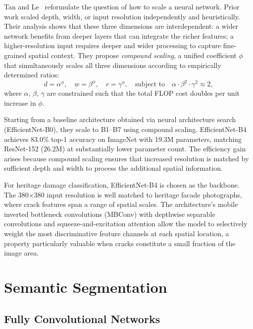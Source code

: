 \documentclass[12pt,a4paper]{article}
\begin{document}
Tan and Le~\cite{tan2019efficientnet} reformulate the question of how to scale a neural network. Prior work scaled depth, width, or input resolution independently and heuristically. Their analysis shows that these three dimensions are interdependent: a wider network benefits from deeper layers that can integrate the richer features; a higher-resolution input requires deeper and wider processing to capture fine-grained spatial context. They propose \textit{compound scaling}, a unified coefficient $\phi$ that simultaneously scales all three dimensions according to empirically determined ratios:
\begin{equation}
  d = \alpha^\phi, \quad w = \beta^\phi, \quad r = \gamma^\phi,
  \quad \text{subject to} \quad \alpha \cdot \beta^2 \cdot \gamma^2 \approx 2,
\end{equation}
where $\alpha$, $\beta$, $\gamma$ are constrained such that the total FLOP cost doubles per unit increase in $\phi$.

Starting from a baseline architecture obtained via neural architecture search (EfficientNet-B0), they scale to B1--B7 using compound scaling. EfficientNet-B4 achieves 83.0\% top-1 accuracy on ImageNet with 19.3M parameters, matching ResNet-152 (26.2M) at substantially lower parameter count. The efficiency gain arises because compound scaling ensures that increased resolution is matched by sufficient depth and width to process the additional spatial information.

For heritage damage classification, EfficientNet-B4 is chosen as the backbone. The 380$\times$380 input resolution is well matched to heritage facade photographs, where crack features span a range of spatial scales. The architecture's mobile inverted bottleneck convolutions (MBConv) with depthwise separable convolutions and squeeze-and-excitation attention allow the model to selectively weight the most discriminative feature channels at each spatial location, a property particularly valuable when cracks constitute a small fraction of the image area.

\section{Semantic Segmentation}
\label{sec:segmentation}

\subsection{Fully Convolutional Networks}
\end{document}

